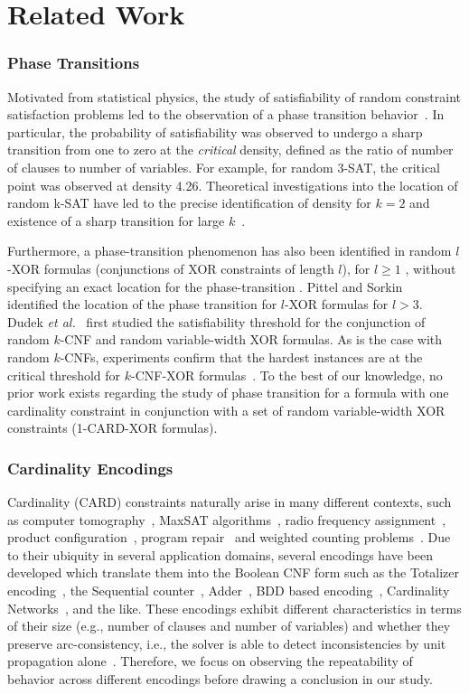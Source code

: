 

\section{Related Work} \label{sec:related}
\subsubsection{Phase Transitions}
Motivated from statistical physics, the study of satisfiability of random constraint satisfaction problems led to the observation of a phase transition behavior~\cite{KS94}. In particular, the probability of satisfiability was observed to undergo a sharp transition from one to zero at the {\em critical} density, defined as the ratio of number of clauses to number of variables. For example, for random 3-SAT, the critical point was observed at density 4.26. Theoretical investigations into the location of random k-SAT have led to the precise identification of density for $k=2$ and existence of a sharp transition for large $k$~\cite{DSS15}. 

Furthermore, a phase-transition phenomenon has also been identified in
random $l$-XOR formulas (conjunctions of XOR constraints of length $l$), for $l \geq 1$ , without specifying an exact location for the phase-transition \cite{CDH03}. Pittel and Sorkin~ identified the location of the phase transition for $l$-XOR formulas for $l > 3$. Dudek \textit{et al.}~ first studied the satisfiability threshold for the conjunction of random $k$-CNF and random variable-width XOR formulas. As is the case with random $k$-CNFs, experiments confirm that the hardest instances are at the critical threshold for $k$-CNF-XOR formulas~\cite{DMV17}. To the best of our knowledge, no prior work exists regarding the study of phase transition for a formula with one cardinality constraint in conjunction with a set of random variable-width XOR constraints (1-CARD-XOR formulas). 

\subsubsection{Cardinality Encodings}
Cardinality (CARD) constraints  naturally arise in many different contexts, such as computer tomography~\cite{GGP99}, MaxSAT algorithms~\cite{FM06}, radio frequency assignment~\cite{YD13}, product configuration~\cite{YD13}, program repair~\cite{joshikroening-fm15} and weighted counting problems~\cite{Par18}. Due to their ubiquity in several application domains, several encodings have been developed which translate them into the Boolean CNF form such as the Totalizer encoding~\cite{totalizer}, the Sequential counter~\cite{Sinz05}, Adder~\cite{ES06}, BDD based encoding~\cite{bdd},  Cardinality Networks~\cite{CardinalityNA09}, and the like. These encodings exhibit different characteristics in terms of their size (e.g., number of clauses and number of variables) and whether they preserve arc-consistency, i.e., the solver is able to detect inconsistencies by unit propagation alone~\cite{ZY00}. Therefore, we focus on observing the repeatability of behavior across different encodings before drawing a conclusion in our study. 
